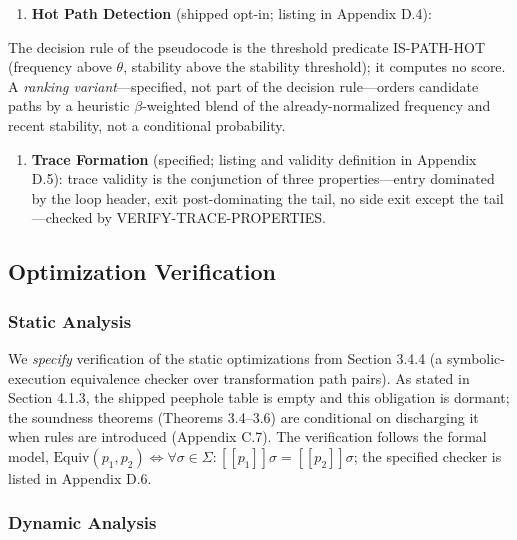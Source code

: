 \documentclass[
  sigconf,
  anonymous]{acmart}
\providecommand{\tightlist}{%
  \setlength{\itemsep}{0pt}\setlength{\parskip}{0pt}}
\newcommand{\llbracket}{[\![}
\newcommand{\rrbracket}{]\!]}
\begin{document}
\begin{enumerate}
\def\labelenumi{\arabic{enumi}.}
\tightlist
\item
  \textbf{Hot Path Detection} (shipped opt-in; listing in Appendix D.4):
\end{enumerate}

The decision rule of the pseudocode is the threshold predicate
IS-PATH-HOT (frequency above \(\theta\), stability above the stability
threshold); it computes no score. A \emph{ranking variant}---specified,
not part of the decision rule---orders candidate paths by a heuristic
\(\beta\)-weighted blend of the already-normalized frequency and recent
stability, not a conditional probability.

\begin{enumerate}
\def\labelenumi{\arabic{enumi}.}
\setcounter{enumi}{1}
\tightlist
\item
  \textbf{Trace Formation} (specified; listing and validity definition
  in Appendix D.5): trace validity is the conjunction of three
  properties---entry dominated by the loop header, exit post-dominating
  the tail, no side exit except the tail---checked by
  VERIFY-TRACE-PROPERTIES.
\end{enumerate}

\subsection{Optimization Verification}\label{optimization-verification}

\subsubsection{Static Analysis}\label{static-analysis}

We \emph{specify} verification of the static optimizations from Section
3.4.4 (a symbolic-execution equivalence checker over transformation path
pairs). As stated in Section 4.1.3, the shipped peephole table is empty
and this obligation is dormant; the soundness theorems (Theorems
3.4--3.6) are conditional on discharging it when rules are introduced
(Appendix C.7). The verification follows the formal model,
\(\text{Equiv}(p_1, p_2) \iff \forall \sigma \in \Sigma: \llbracket p_1 \rrbracket \sigma = \llbracket p_2 \rrbracket \sigma\);
the specified checker is listed in Appendix D.6.

\subsubsection{Dynamic Analysis}\label{dynamic-analysis}
\end{document}
